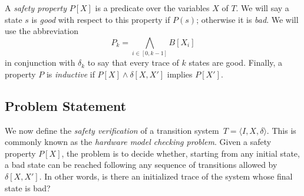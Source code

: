 A \textit{safety property} $P[X]$ is a predicate over the variables $X$ of $T$.  We will 
say a state $s$ is \textit{good} with respect to this property if $P(s)$; otherwise it is \textit{bad}. 
We will use the abbreviation \[P_k = \underset{i \in [0,k-1]}{\bigwedge} B[X_i]\]
in conjunction with $\delta_k$ to say that every trace of $k$ states are good.  Finally, a property $P$ is \textit{inductive} if $P[X] \wedge \delta[X,X']$ implies $P[X']$.    

\subsection{Problem Statement} 

We now define the \textit{safety verification} of a transition system~$T = \langle I,X,\delta\rangle$.
This is commonly known as the \textit{hardware model checking problem}.  
Given a safety property $P[X]$, the problem is to decide whether, starting from any initial state, a bad state can be reached following any sequence of transitions allowed by $\delta[X,X']$. In other words, is there an initialized trace of the system whose final state is bad?

